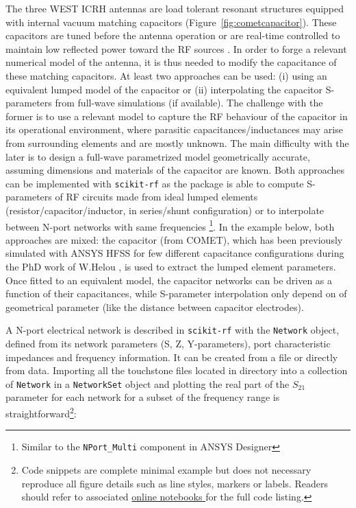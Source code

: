 {The three WEST ICRH antennas are load tolerant resonant structures equipped with internal vacuum matching capacitors (Figure~\ref{fig:cometcapacitor}). These capacitors are tuned before the antenna operation or are real-time controlled to maintain low reflected power toward the RF sources . In order to forge a relevant numerical model of the antenna, it is thus needed to modify the capacitance of these matching capacitors. At least two approaches can be used: (i) using an equivalent lumped model of the capacitor or (ii) interpolating the capacitor S-parameters from full-wave simulations (if available). The challenge with the former is to use a relevant model to capture the RF behaviour of the capacitor in its operational environment, where parasitic capacitances/inductances may arise from surrounding elements and are mostly unknown. The main difficulty with the later is to design a full-wave parametrized model geometrically accurate, assuming dimensions and materials of the capacitor are known. Both approaches can be implemented with \texttt{scikit-rf} as the package is able to compute S-parameters of RF circuits made from ideal lumped elements (resistor/capacitor/inductor, in series/shunt configuration)  or to interpolate between N-port networks with same frequencies \footnote{Similar to the \texttt{NPort\_Multi} component in ANSYS Designer}. In the example below, both approaches are mixed: the capacitor (from COMET), which has been previously simulated with ANSYS HFSS for few different capacitance configurations during the PhD work of W.Helou , is used to extract the lumped element parameters. Once fitted to an equivalent model, the capacitor networks can be driven as a function of their capacitances, while S-parameter interpolation only depend on of geometrical parameter (like the distance between capacitor electrodes).

A N-port electrical network is described in \texttt{scikit-rf} with the \texttt{Network} object, defined from its network parameters (S, Z, Y-parameters), port characteristic impedances and frequency information. It can be created from a file or directly from data. Importing all the touchstone files located in directory into a collection of \texttt{Network} in a \texttt{NetworkSet} object and plotting the real part of the $S_{21}$ parameter for each network for a subset of the frequency range is straightforward\footnote{Code snippets are complete minimal example but does not necessary reproduce all figure details such as line styles, markers or labels. Readers should refer to associated \href{https://doi.org/10.5281/zenodo.2668370}{online notebooks }for the full code listing.}:

}
